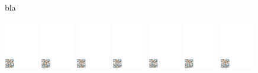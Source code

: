 \documentclass[a4paper,UKenglish,cleveref, autoref, thm-restate]{lipics-v2021}
\begin{document}
\begin{figure}
  \centering
  \small
  
  \caption{bla}
\end{figure}

\begin{figure}
  \centering
  \hspace{0.055\textwidth}%
  \includegraphics[page=1,width=0.132\textwidth]{../data/visualization}%
  \hspace{0.002\textwidth}%
  \includegraphics[page=2,width=0.132\textwidth]{../data/visualization}%
  \hspace{0.002\textwidth}%
  \includegraphics[page=3,width=0.132\textwidth]{../data/visualization}%
  \hspace{0.002\textwidth}%
  \includegraphics[page=4,width=0.132\textwidth]{../data/visualization}%
  \hspace{0.002\textwidth}%
  \includegraphics[page=5,width=0.132\textwidth]{../data/visualization}%
  \hspace{0.002\textwidth}%
  \includegraphics[page=6,width=0.132\textwidth]{../data/visualization}%
  \hspace{0.002\textwidth}%
  \includegraphics[page=7,width=0.132\textwidth]{../data/visualization}%
  

\end{figure}
\end{document}
